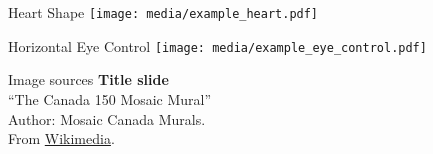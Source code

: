 \documentclass[handout,aspectratio=169]{beamer}
\begin{document}
	\begin{frame}{Heart Shape}
		\centering
		\texttt{[image: media/example\_heart.pdf]}
	\end{frame}

	\begin{frame}{Horizontal Eye Control}
		\centering
		\texttt{[image: media/example\_eye\_control.pdf]}
	\end{frame}

	\backupbegin

	\begin{frame}[noframenumbering]{Image sources}
		\small
		\textbf{Title slide}\\\enquote{The Canada 150 Mosaic Mural}\\Author: Mosaic Canada Murals.\\From \href{https://commons.wikimedia.org/wiki/File:Canada_150_Mosaic_Engine.jpg}{Wikimedia}.
	\end{frame}


	\backupend
	
\end{document}
